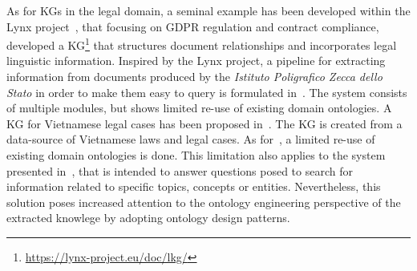 \documentclass[runningheads]{llncs}
\begin{document}
As for %
KGs in the legal domain, a seminal example has been developed within %
the Lynx project~\cite{schneider2022lynx}, that focusing on GDPR regulation and contract compliance, %
developed a KG\footnote{\url{https://lynx-project.eu/doc/lkg/}} %
that structures document relationships and incorporates legal linguistic information. %
Inspired by the Lynx project, %
a pipeline %
for extracting information from documents produced by the \textit{Istituto Poligrafico Zecca dello Stato} in order to make them easy to query is formulated in~\cite{Anelli23}. The system consists of multiple  %
modules, %
but shows limited re-use of existing domain ontologies. A KG for Vietnamese legal cases has been %
proposed in~\cite{Vuong23}. The KG is created from a data-source of Vietnamese laws and legal cases. %
As for~\cite{Anelli23}, %
a limited re-use of existing domain ontologies is done. This limitation also applies to the system presented in~\cite{Sovrano20}, that is intended to answer questions posed to search for information related to specific topics, concepts or entities. Nevertheless, this solution poses increased attention to the ontology engineering perspective of the extracted knowlege by adopting ontology design patterns. %
\end{document}
